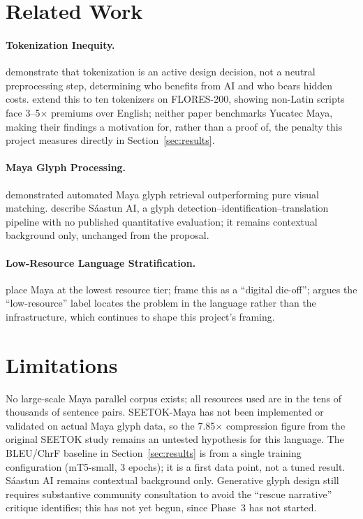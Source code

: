 \documentclass[11pt]{article}
\begin{document}
\section{Related Work}
\label{sec:related}

\paragraph{Tokenization Inequity.}
\citet{haase2026} demonstrate that tokenization is an active design decision,
not a neutral preprocessing step, determining who benefits from AI and who
bears hidden costs. \citet{churchill2026} extend this to ten tokenizers on
FLORES-200, showing non-Latin scripts face 3--5$\times$ premiums over
English; neither paper benchmarks Yucatec Maya, making their findings a
motivation for, rather than a proof of, the penalty this project measures
directly in Section~\ref{sec:results}.

\paragraph{Maya Glyph Processing.}
\citet{hu2014} demonstrated automated Maya glyph retrieval outperforming pure
visual matching. \citet{rosado2025} describe S\'aastun AI, a glyph
detection--identification--translation pipeline with no published
quantitative evaluation; it remains contextual background only, unchanged
from the proposal.

\paragraph{Low-Resource Language Stratification.}
\citet{joshi2020} place Maya at the lowest resource tier; \citet{kornai2013}
frame this as a ``digital die-off''; \citet{bird2022} argues the
``low-resource'' label locates the problem in the language rather than the
infrastructure, which continues to shape this project's framing.

\section*{Limitations}
\label{sec:limitations}

No large-scale Maya parallel corpus exists; all resources used are in the
tens of thousands of sentence pairs. SEETOK-Maya has not been implemented or
validated on actual Maya glyph data, so the 7.85$\times$ compression figure
from the original SEETOK study remains an untested hypothesis for this
language. The BLEU/ChrF baseline in Section~\ref{sec:results} is from a
single training configuration (mT5-small, 3 epochs); it is a first data
point, not a tuned result. S\'aastun AI \cite{rosado2025} remains contextual
background only. Generative glyph design still requires substantive
community consultation to avoid the ``rescue narrative'' critique
\citet{bird2022} identifies; this has not yet begun, since Phase~3 has not
started.
\end{document}
